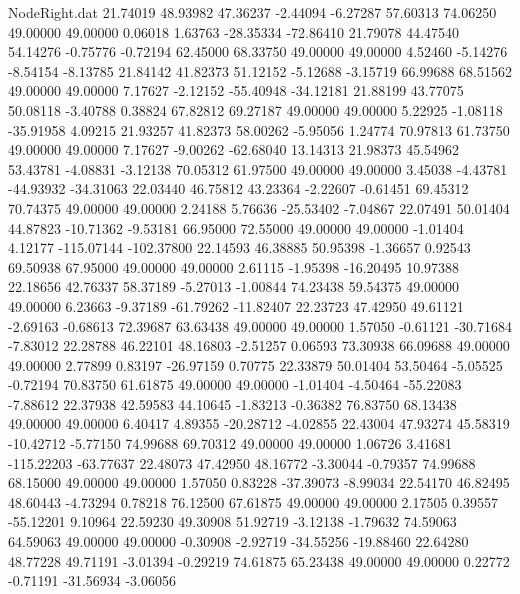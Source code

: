 \begin{filecontents}{NodeRight.dat}
  21.74019   48.93982   47.36237    -2.44094   -6.27287   57.60313   74.06250   49.00000   49.00000    0.06018    1.63763  -28.35334  -72.86410
  21.79078   44.47540   54.14276    -0.75776   -0.72194   62.45000   68.33750   49.00000   49.00000    4.52460   -5.14276   -8.54154   -8.13785
  21.84142   41.82373   51.12152    -5.12688   -3.15719   66.99688   68.51562   49.00000   49.00000    7.17627   -2.12152  -55.40948  -34.12181
  21.88199   43.77075   50.08118    -3.40788    0.38824   67.82812   69.27187   49.00000   49.00000    5.22925   -1.08118  -35.91958    4.09215
  21.93257   41.82373   58.00262    -5.95056    1.24774   70.97813   61.73750   49.00000   49.00000    7.17627   -9.00262  -62.68040   13.14313
  21.98373   45.54962   53.43781    -4.08831   -3.12138   70.05312   61.97500   49.00000   49.00000    3.45038   -4.43781  -44.93932  -34.31063
  22.03440   46.75812   43.23364    -2.22607   -0.61451   69.45312   70.74375   49.00000   49.00000    2.24188    5.76636  -25.53402   -7.04867
  22.07491   50.01404   44.87823   -10.71362   -9.53181   66.95000   72.55000   49.00000   49.00000   -1.01404    4.12177 -115.07144 -102.37800
  22.14593   46.38885   50.95398    -1.36657    0.92543   69.50938   67.95000   49.00000   49.00000    2.61115   -1.95398  -16.20495   10.97388
  22.18656   42.76337   58.37189    -5.27013   -1.00844   74.23438   59.54375   49.00000   49.00000    6.23663   -9.37189  -61.79262  -11.82407
  22.23723   47.42950   49.61121    -2.69163   -0.68613   72.39687   63.63438   49.00000   49.00000    1.57050   -0.61121  -30.71684   -7.83012
  22.28788   46.22101   48.16803    -2.51257    0.06593   73.30938   66.09688   49.00000   49.00000    2.77899    0.83197  -26.97159    0.70775
  22.33879   50.01404   53.50464    -5.05525   -0.72194   70.83750   61.61875   49.00000   49.00000   -1.01404   -4.50464  -55.22083   -7.88612
  22.37938   42.59583   44.10645    -1.83213   -0.36382   76.83750   68.13438   49.00000   49.00000    6.40417    4.89355  -20.28712   -4.02855
  22.43004   47.93274   45.58319   -10.42712   -5.77150   74.99688   69.70312   49.00000   49.00000    1.06726    3.41681 -115.22203  -63.77637
  22.48073   47.42950   48.16772    -3.30044   -0.79357   74.99688   68.15000   49.00000   49.00000    1.57050    0.83228  -37.39073   -8.99034
  22.54170   46.82495   48.60443    -4.73294    0.78218   76.12500   67.61875   49.00000   49.00000    2.17505    0.39557  -55.12201    9.10964
  22.59230   49.30908   51.92719    -3.12138   -1.79632   74.59063   64.59063   49.00000   49.00000   -0.30908   -2.92719  -34.55256  -19.88460
  22.64280   48.77228   49.71191    -3.01394   -0.29219   74.61875   65.23438   49.00000   49.00000    0.22772   -0.71191  -31.56934   -3.06056

\end{filecontents}
